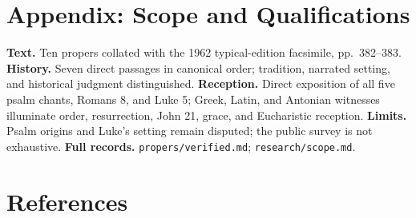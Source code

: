 \section*{Appendix: Scope and Qualifications}

\begin{studyframe}
\textbf{Text.} Ten propers collated with the 1962 typical-edition facsimile, pp.~382--383. \textbf{History.} Seven direct passages in canonical order; tradition, narrated setting, and historical judgment distinguished. \textbf{Reception.} Direct exposition of all five psalm chants, Romans 8, and Luke 5; Greek, Latin, and Antonian witnesses illuminate order, resurrection, John 21, grace, and Eucharistic reception. \textbf{Limits.} Psalm origins and Luke's setting remain disputed; the public survey is not exhaustive. \textbf{Full records.} \nolinkurl{propers/verified.md}; \nolinkurl{research/scope.md}.
\end{studyframe}

\section*{References}

